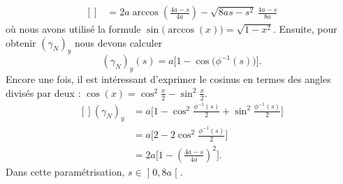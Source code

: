 \begin{example}
\begin{equation}
\begin{aligned}[]
        &=2a\arccos\left( \frac{ 4a-s }{ 4a } \right)-\sqrt{8as-s^2}\,\frac{ 4a-s }{ 8a }
    \end{aligned}
\end{equation}
où nous avons utilisé la formule $\sin\big( \arccos(x) \big)=\sqrt{1-x^2}$. Ensuite, pour obtenir $(\gamma_N)_y$ nous devons calculer
\begin{equation}
    (\gamma_N)_y(s)=a\big[ 1-\cos\big( \phi^{-1}(s) \big) \big].
\end{equation}
Encore une fois, il est intéressant d'exprimer le cosinus en termes des angles divisés par deux : $\cos(x)=\cos^2\frac{ x }{2}-\sin^2\frac{ x }{2}$.
\begin{equation}
    \begin{aligned}[]
        (\gamma_N)_y&=a\Big[ 1-\cos^2\frac{ \phi^{-1}(s) }{2}+\sin^2\frac{ \phi^{-1}(s) }{2} \Big]\\
        &=a\Big[ 2-2\cos^2\frac{ \phi^{-1}(s) }{2} \Big]\\
        &=2a\Big[ 1-\left( \frac{ 4a-s }{ 4a } \right)^2 \Big].
    \end{aligned}
\end{equation}
Dans cette paramétrisation, $s\in\mathopen] 0 , 8a \mathclose[$.
\end{example}

